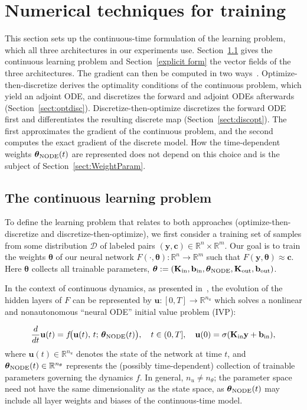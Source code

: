 \documentclass[pdflatex,sn-mathphys-num]{sn-jnl}%
\newcommand{\R}{\mathbb{R}}
\newcommand{\bfu}{\mathbf{u}}
\newcommand{\bfc}{\mathbf{c}}
\newcommand{\bfy}{\mathbf{y}}
\newcommand{\bfb}{\mathbf{b}}
\newcommand{\bfK}{\mathbf{K}}
\newcommand{\bftheta}{\boldsymbol{\theta}}
\newcommand{\calD}{\mathcal{D}}
\theoremstyle{thmstyleone}%
\theoremstyle{thmstyletwo}%
\theoremstyle{thmstylethree}%
\begin{document}
\section{Numerical techniques for training}\label{sect:TrainingAlgs}
This section sets up the continuous-time formulation of the learning problem, which all three architectures in our experiments use.
%
Section~\ref{sect:continuousproblem} gives the continuous learning problem and Section~\ref{explicit form} the vector fields of the three architectures.
%
The gradient can then be computed in two ways~\cite{discoptvsoptdisc}.
%
Optimize-then-discretize derives the optimality conditions of the continuous problem, which yield an adjoint ODE, and discretizes the forward and adjoint ODEs afterwards (Section~\ref{sect:optdisc}).
%
Discretize-then-optimize discretizes the forward ODE first and differentiates the resulting discrete map (Section~\ref{sect:discopt}).
%
The first approximates the gradient of the continuous problem, and the second computes the exact gradient of the discrete model.
%
How the time-dependent weights $\bftheta_{\rm NODE}(t)$ are represented does not depend on this choice and is the subject of Section~\ref{sect:WeightParam}.

\subsection{The continuous learning problem}\label{sect:continuousproblem}
To define the learning problem that relates to both approaches (optimize-then-discretize and discretize-then-optimize), we first consider a training set of samples from some distribution $\calD$ of labeled pairs $(\bfy,\bfc) \in \R^n \times \R^m$.
%
Our goal is to train the weights $\bftheta$ of our neural network $F(\cdot,\bftheta):\R^n \to \R^m$ such that $F(\bfy,\bftheta) \approx \bfc$. 
%
Here \(\bftheta\) collects all trainable parameters,
\(\bftheta := (\bfK_{\rm in},\bfb_{\rm in},\bftheta_{\rm NODE},\bfK_{\rm out},\bfb_{\rm out})\).
 
In the context of continuous dynamics, as presented in~\cite{ChenEtAl2018},  the evolution of the hidden layers of $F$ can be represented by  \(\bfu:[0,T]\to\mathbb{R}^{n_u}\) which solves a nonlinear and nonautonomous ``neural ODE'' initial value problem (IVP):
 
\begin{equation}\label{eq:IVP}
    \frac{d}{dt} \bfu(t)
    = f\!\big(\bfu(t),\, t;\, \bftheta_{\rm NODE}(t)\big),
    \quad t \in (0,T], 
    \quad \bfu(0) = \sigma(\bfK_{\rm in} \bfy + \bfb_{\rm in}),
\end{equation}
%
where $\bfu(t) \in \mathbb{R}^{n_u}$ denotes the state of the network at time $t$, and 
$\bftheta_{\rm NODE}(t) \in \mathbb{R}^{n_\theta}$ represents the (possibly time-dependent) collection of trainable parameters governing the dynamics $f$. 
%
In general, $n_u \neq n_\theta$; the parameter space need not have the same dimensionality as the state space, as $\bftheta_{\rm NODE}(t)$ may include all layer weights and biases of the continuous-time model.
%
 
\end{document}
